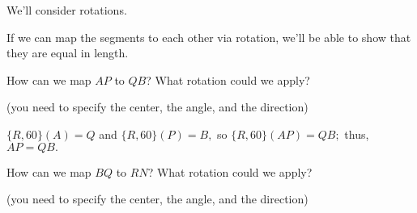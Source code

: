 





We'll consider rotations.

If we can map the segments to each other via rotation, we'll be able to show that they are equal in length.

How can we map $AP$ to $QB$? What rotation could we apply?

(you need to specify the center, the angle, and the direction)





$\{R,60\} (A) = Q$ and $\{R,60\} (P) = B,$ so $\{R, 60\} (AP) = QB;$ thus, $AP = QB.$

How can we map $BQ$ to $RN$? What rotation could we apply?

(you need to specify the center, the angle, and the direction)



